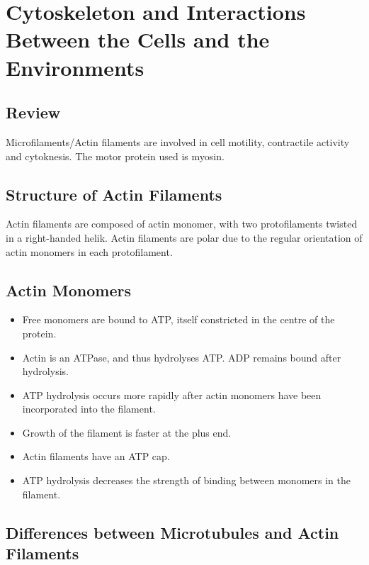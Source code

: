 \documentclass[11pt]{scrartcl}
\begin{document}
\section{Cytoskeleton and Interactions Between the Cells and the Environments}

\subsection{Review}

Microfilaments/Actin filaments are involved in cell motility, contractile activity and cytoknesis. The motor protein used is myosin. 

\subsection{Structure of Actin Filaments}

Actin filaments are composed of actin monomer, with two protofilaments
twisted in a right-handed helik. Actin filaments are polar due to the
regular orientation of actin monomers in each protofilament.

\subsection{Actin Monomers}

\begin{itemize}
\item Free monomers are bound to ATP, itself constricted in the centre of the protein. 

\item Actin is an ATPase, and thus hydrolyses ATP. ADP remains bound after hydrolysis.

\item ATP hydrolysis occurs more rapidly after actin monomers have been incorporated into the filament.

\item Growth of the filament is faster at the plus end. 

\item Actin filaments have an ATP cap.

\item ATP hydrolysis decreases the strength of binding between monomers in the filament.
\end{itemize}

\subsection{Differences between Microtubules and Actin Filaments}
\end{document}
